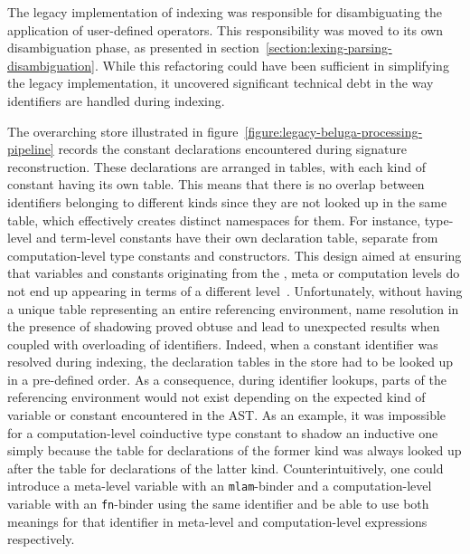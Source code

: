 

The legacy implementation of indexing was responsible for disambiguating the application of user-defined operators.
This responsibility was moved to its own disambiguation phase, as presented in section~\ref{section:lexing-parsing-disambiguation}.
While this refactoring could have been sufficient in simplifying the legacy implementation, it uncovered significant technical debt in the way identifiers are handled during indexing.

The overarching store illustrated in figure~\ref{figure:legacy-beluga-processing-pipeline} records the constant declarations encountered during signature reconstruction.
These declarations are arranged in tables, with each kind of constant having its own table.
This means that there is no overlap between identifiers belonging to different kinds since they are not looked up in the same table, which effectively creates distinct namespaces for them.
For instance, \LF type-level and term-level constants have their own declaration table, separate from computation-level type constants and constructors.
This design aimed at ensuring that variables and constants originating from the \LF, meta or computation levels do not end up appearing in terms of a different level~\cite{germain2010implementation}.
Unfortunately, without having a unique table representing an entire referencing environment, name resolution in the presence of shadowing proved obtuse and lead to unexpected results when coupled with overloading of identifiers.
Indeed, when a constant identifier was resolved during indexing, the declaration tables in the store had to be looked up in a pre-defined order.
As a consequence, during identifier lookups, parts of the referencing environment would not exist depending on the expected kind of variable or constant encountered in the \ac{AST}.
As an example, it was impossible for a computation-level coinductive type constant to shadow an inductive one simply because the table for declarations of the former kind was always looked up after the table for declarations of the latter kind.
Counterintuitively, one could introduce a meta-level variable with an \verb|mlam|-binder and a computation-level variable with an \verb|fn|-binder using the same identifier and be able to use both meanings for that identifier in meta-level and computation-level expressions respectively.

